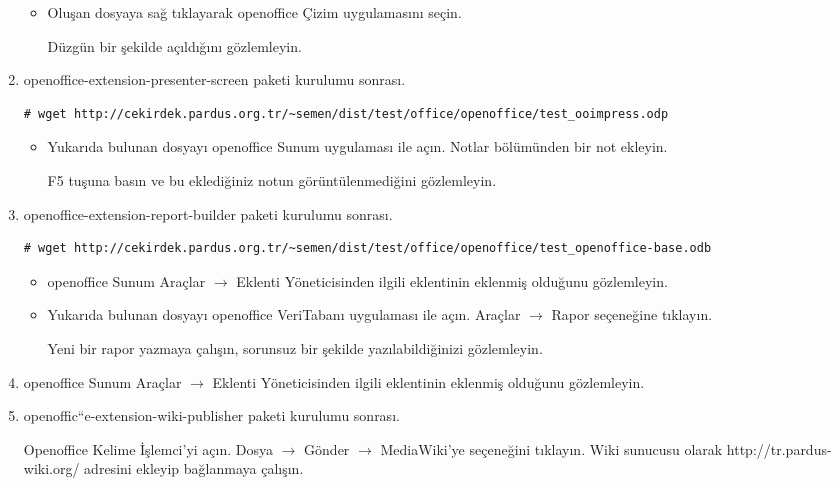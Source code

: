 \documentclass[a4paper,10pt]{article}
\begin{document}
\begin{enumerate}
\begin{itemize}
\item Oluşan dosyaya sağ tıklayarak openoffice Çizim uygulamasını seçin.

Düzgün bir şekilde açıldığını gözlemleyin.

\end{itemize}
 
\item openoffice-extension-presenter-screen paketi kurulumu sonrası.
\begin{verbatim}
# wget http://cekirdek.pardus.org.tr/~semen/dist/test/office/openoffice/test_ooimpress.odp
\end{verbatim}

\begin{itemize}


\item Yukarıda bulunan dosyayı openoffice Sunum uygulaması ile açın. Notlar bölümünden bir not ekleyin. 

F5 tuşuna basın ve bu eklediğiniz notun görüntülenmediğini gözlemleyin.

\end{itemize}
\item openoffice-extension-report-builder paketi kurulumu sonrası.
\begin{verbatim}
# wget http://cekirdek.pardus.org.tr/~semen/dist/test/office/openoffice/test_openoffice-base.odb
\end{verbatim}

\begin{itemize}
\item openoffice Sunum Araçlar $\rightarrow$ Eklenti Yöneticisinden ilgili eklentinin eklenmiş olduğunu gözlemleyin.

\item Yukarıda bulunan dosyayı openoffice VeriTabanı uygulaması ile açın. Araçlar $\rightarrow$ Rapor seçeneğine tıklayın.

Yeni bir rapor yazmaya çalışın, sorunsuz bir şekilde yazılabildiğinizi gözlemleyin.

\end{itemize}
\item openoffice Sunum Araçlar $\rightarrow$ Eklenti Yöneticisinden ilgili eklentinin eklenmiş olduğunu gözlemleyin.

\item openoffic``e-extension-wiki-publisher paketi kurulumu sonrası.

Openoffice Kelime İşlemci'yi açın. Dosya $\rightarrow$ Gönder $\rightarrow$ MediaWiki'ye seçeneğini tıklayın. Wiki sunucusu olarak http://tr.pardus-wiki.org/ adresini ekleyip bağlanmaya çalışın.


\end{enumerate}
\end{document}
